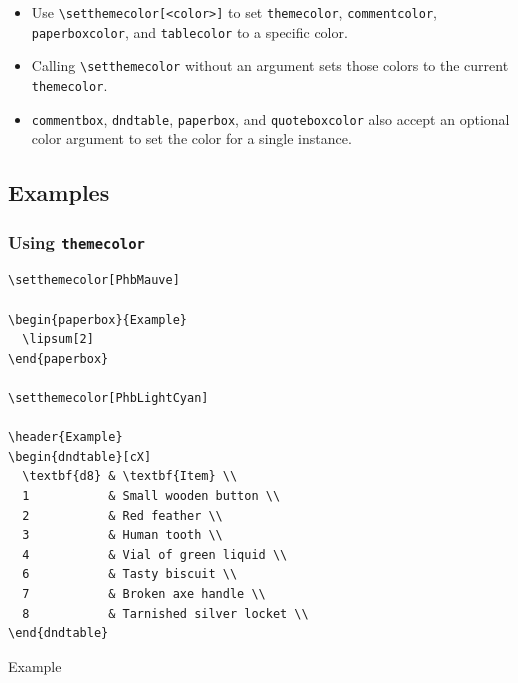\documentclass[letterpaper,10pt,twoside,twocolumn,openany]{book}
\begin{document}
\begin{itemize}
  \item Use \lstinline!\setthemecolor[<color>]! to set \lstinline!themecolor!, \lstinline!commentcolor!, \lstinline!paperboxcolor!, and \lstinline!tablecolor! to a specific color.
  \item Calling \lstinline!\setthemecolor! without an argument sets those colors to the current \lstinline!themecolor!.
  \item \lstinline!commentbox!, \lstinline!dndtable!, \lstinline!paperbox!, and \lstinline!quoteboxcolor! also accept an optional color argument to set the color for a single instance.
\end{itemize}

\subsection{Examples}

\subsubsection{Using \lstinline!themecolor!}

\begin{lstlisting}
\setthemecolor[PhbMauve]

\begin{paperbox}{Example}
  \lipsum[2]
\end{paperbox}

\setthemecolor[PhbLightCyan]

\header{Example}
\begin{dndtable}[cX]
  \textbf{d8} & \textbf{Item} \\
  1           & Small wooden button \\
  2           & Red feather \\
  3           & Human tooth \\
  4           & Vial of green liquid \\
  6           & Tasty biscuit \\
  7           & Broken axe handle \\
  8           & Tarnished silver locket \\
\end{dndtable}
\end{lstlisting}

\begingroup
\setthemecolor[PhbMauve]

\begin{paperbox}{Example}
  \lipsum[2]
\end{paperbox}
\end{document}
